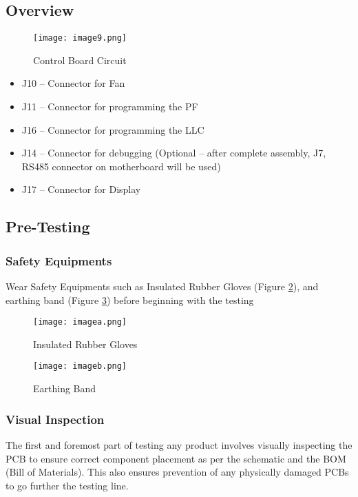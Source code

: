 \subsection{Overview}
\begin{figure}[H]
    \centering
    \texttt{[image: image9.png]}
    \caption{Control Board Circuit}
    \label{fig:image9}
\end{figure}
\begin{itemize}
    \item J10 – Connector for Fan
    \item J11 – Connector for programming the PF
    \item J16 – Connector for programming the LLC
    \item J14 – Connector for debugging (Optional – after complete assembly, J7, RS485 connector on motherboard will be used)
    \item J17 – Connector for Display
\end{itemize}

\subsection{Pre-Testing}

\subsubsection{Safety Equipments}
Wear Safety Equipments such as Insulated Rubber Gloves (Figure \ref*{fig:imagea}), and earthing band (Figure \ref*{fig:imageb}) before beginning with the testing
\begin{figure}[H]
    \centering
    \texttt{[image: imagea.png]}
    \caption{Insulated Rubber Gloves}
    \label{fig:imagea}
\end{figure}
\begin{figure}[H]
    \centering
    \texttt{[image: imageb.png]}
    \caption{Earthing Band}
    \label{fig:imageb}
\end{figure}

\subsubsection{Visual Inspection}
The first and foremost part of testing any product involves visually inspecting the PCB to ensure correct component placement as per the schematic and the BOM (Bill of Materials). This also ensures prevention of any physically damaged PCBs to go further the testing line.


